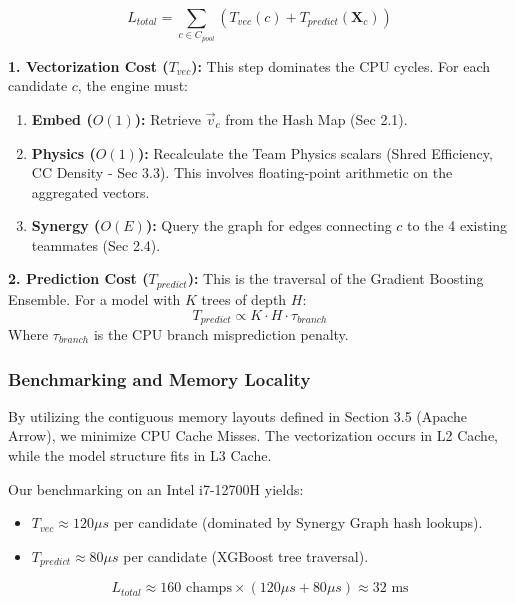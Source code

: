 \documentclass[12pt, a4paper]{article}
\begin{document}
    \begin{equation}
        L_{total} = \sum_{c \in C_{pool}} \left( T_{vec}(c) + T_{predict}(\mathbf{X}_{c}) \right)
    \end{equation}

    \textbf{1. Vectorization Cost ($T_{vec}$):}
    This step dominates the CPU cycles. For each candidate $c$, the engine must:
    \begin{enumerate}
        \item \textbf{Embed ($O(1)$):} Retrieve $\vec{v}_c$ from the Hash Map (Sec 2.1).
        \item \textbf{Physics ($O(1)$):} Recalculate the Team Physics scalars (Shred Efficiency, CC Density - Sec 3.3). This involves floating-point arithmetic on the aggregated vectors.
        \item \textbf{Synergy ($O(E)$):} Query the graph for edges connecting $c$ to the 4 existing teammates (Sec 2.4).
    \end{enumerate}

    \textbf{2. Prediction Cost ($T_{predict}$):}
    This is the traversal of the Gradient Boosting Ensemble. For a model with $K$ trees of depth $H$:
    \begin{equation}
        T_{predict} \propto K \cdot H \cdot \tau_{branch}
    \end{equation}
    Where $\tau_{branch}$ is the CPU branch misprediction penalty.

    \subsubsection{Benchmarking and Memory Locality}
    By utilizing the contiguous memory layouts defined in Section 3.5 (Apache Arrow), we minimize CPU Cache Misses. The vectorization occurs in L2 Cache, while the model structure fits in L3 Cache.

    Our benchmarking on an Intel i7-12700H yields:
    \begin{itemize}
        \item $T_{vec} \approx 120 \mu s$ per candidate (dominated by Synergy Graph hash lookups).
        \item $T_{predict} \approx 80 \mu s$ per candidate (XGBoost tree traversal).
    \end{itemize}

    \begin{equation}
        L_{total} \approx 160 \text{ champs} \times (120 \mu s + 80 \mu s) \approx 32 \text{ ms}
    \end{equation}
\end{document}
